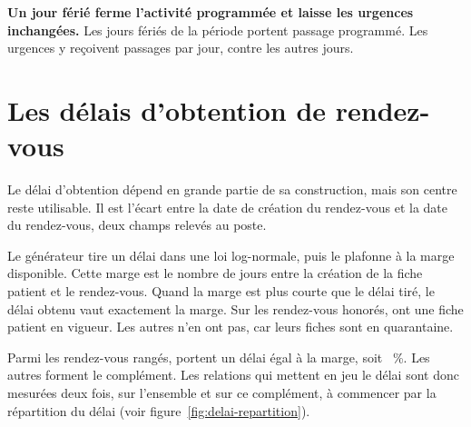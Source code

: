 \textbf{Un jour férié ferme l'activité programmée et laisse les urgences
inchangées.} Les  jours fériés de la période portent
 passage programmé. Les urgences y reçoivent
 passages par jour, contre
 les autres jours.

\section{Les délais d'obtention de rendez-vous}

Le délai d'obtention dépend en grande partie de sa construction, mais son centre reste utilisable.
Il est l'écart entre la date de création du rendez-vous et la date du
rendez-vous, deux champs relevés au poste.

Le générateur tire un délai dans une loi log-normale, puis le plafonne à la marge disponible. Cette
marge est le nombre de jours entre la création de la fiche patient et le rendez-vous. Quand la
marge est plus courte que le délai tiré, le délai obtenu vaut exactement la marge. Sur les
 rendez-vous honorés,  ont une fiche patient en
vigueur. Les  autres n'en ont pas, car leurs
 fiches sont en quarantaine.

Parmi les  rendez-vous rangés,  portent un délai
égal à la marge, soit ~\%. Les  autres
forment le complément. Les relations qui mettent en jeu le délai sont donc mesurées deux fois, sur
l'ensemble et sur ce complément, à commencer par la répartition du délai (voir
figure~\ref{fig:delai-repartition}).

